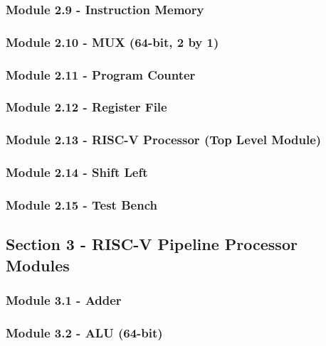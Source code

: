 \documentclass[12pt]{article}
\begin{document}
\subsubsection*{\large Module 2.9 - Instruction Memory}
\label{imem}

\subsubsection*{\large Module 2.10 - MUX (64-bit, 2 by 1)}

\subsubsection*{\large Module 2.11 - Program Counter}

\subsubsection*{\large Module 2.12 - Register File}

\subsubsection*{\large Module 2.13 - RISC-V Processor (Top Level Module)}

\subsubsection*{\large Module 2.14 - Shift Left}

\subsubsection*{\large Module 2.15 - Test Bench}

\subsection*{\Large Section 3 - RISC-V Pipeline Processor Modules}
\subsubsection*{\large Module 3.1 - Adder}

\subsubsection*{\large Module 3.2 - ALU (64-bit)}

\end{document}
